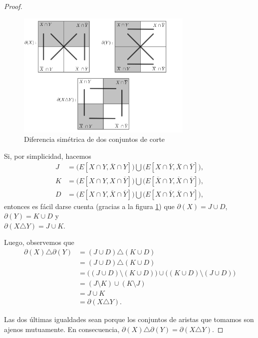 \begin{proof}
\begin{figure}[H]
    \centering
    \includegraphics[width=0.75\textwidth]{img/imgchapter2/cortessim.jpg}
    \caption{Diferencia simétrica de dos conjuntos de corte}
    \label{fig:cortessim}
\end{figure}

Si, por simplicidad, hacemos 
\begin{align*}
    J &= \big ( E[X \cap Y, \overline{X} \cap Y] \big ) \bigcup \big(E[X \cap \overline{Y}, \overline{X} \cap \overline{Y}]\big), \\
    K &= \big(E[X \cap Y, X \cap \overline{Y}]\big) \bigcup \big(E[\overline{X} \cap Y, \overline{X} \cap \overline{Y}]\big), \\
    D &= \big(E[X \cap Y, \overline{X} \cap \overline{Y}]) \bigcup (E[X \cap \overline{Y}, \overline{X} \cap Y]\big),
\end{align*}
entonces es fácil darse cuenta (gracias a la figura \ref{fig:cortessim}) que $\partial(X)= J \cup D$, $ \partial(Y)= K \cup D$ y \\ $\partial(X \triangle Y)= J \cup K.$



Luego, observemos que 
\begin{align*}
    \partial(X) \triangle \partial(Y) &= (J \cup D) \triangle (K \cup D)\\ 
    &= (J \cup D) \triangle (K \cup D)\\ 
    &=  \big((J \cup D) \setminus (K \cup D)\big) \cup  \big((K \cup D) \setminus (J \cup D)\big)\\ 
    &= (J \setminus K) \cup (K \setminus J)\\
    & = J \cup K\\ 
    &= \partial(X \triangle Y).
\end{align*}

Las dos últimas igualdades sean porque los conjuntos de aristas que tomamos son ajenos mutuamente. En consecuencia, $\partial(X) \triangle \partial(Y) = \partial(X \triangle Y).$

\end{proof}

